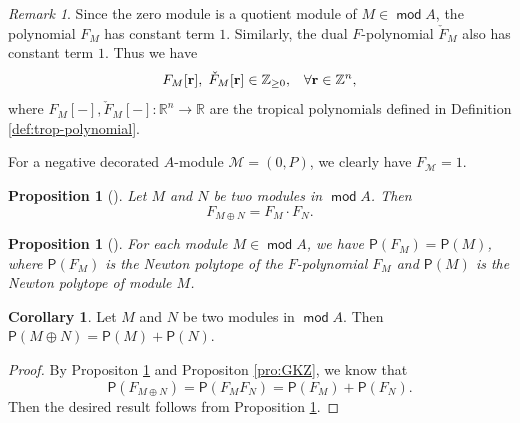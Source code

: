 \documentclass[10pt]{amsart}
\newtheorem{proposition}[theorem]{Proposition}
\theoremstyle{definition}
\newtheorem{corollary}[theorem]{Corollary}
\theoremstyle{remark}
\newtheorem{remark}[theorem]{Remark}
\numberwithin{equation}{section}
\def\mod{\opname{mod}\nolimits}
\newcommand{\opname}[1]{\operatorname{\mathsf{#1}}}
\begin{document}
\begin{remark}\label{rmk:F-M-1}
Since the zero module is a quotient module of $M\in \mod A$,  the polynomial $F_M$ has constant term $1$. Similarly, the dual $F$-polynomial $\check{F}_M$ also has constant term $1$. Thus we have
\[ F_M[{\bf r}], \;\check F_M[{\bf r}]\in\mathbb Z_{\geq 0},\;\;\;\forall {\bf r}\in\mathbb Z^n,
\]
where $F_M[-],\check F_M[-]:\mathbb R^n\to \mathbb R$ are the tropical polynomials defined in Definition \ref{def:trop-polynomial}.
\end{remark}

For a negative decorated $A$-module $\mathcal M=(0,P)$, we clearly have 
$F_{\mathcal M}=1$.





\begin{proposition}[{\cite[Proposition 3.2]{DWZ10}}] \label{pro:DWZ-FmFn}
Let $M$ and $N$ be two modules in $\mod A$. Then \[F_{M\oplus N}=F_M\cdot F_N.\]
\end{proposition}



\begin{proposition}
    [{\cite[Theorem 1.4]{fei_2019a}}] \label{lem:Fei-vertex}
  For each module $M\in\mod A$, we have $\mathsf P(F_M)=\mathsf P(M)$, where $\mathsf P(F_M)$ is 
  the Newton polytope of the $F$-polynomial $F_M$ and $\mathsf P(M)$ is the Newton polytope of module $M$.
\end{proposition}



\begin{corollary}\label{cor:minkowski-sum}
    Let $M$ and $N$ be two modules in $\mod A$. Then $\mathsf P(M\oplus N)=\mathsf P(M)+\mathsf P(N)$.
\end{corollary}
\begin{proof}
By Propositon \ref{pro:DWZ-FmFn} and Propositon \ref{pro:GKZ}, we know that \[\mathsf P(F_{M\oplus N})=\mathsf P(F_{M}F_{N})=\mathsf P(F_M)+\mathsf P(F_N).\] Then the desired result follows from Proposition \ref{lem:Fei-vertex}.
\end{proof}
\end{document}
